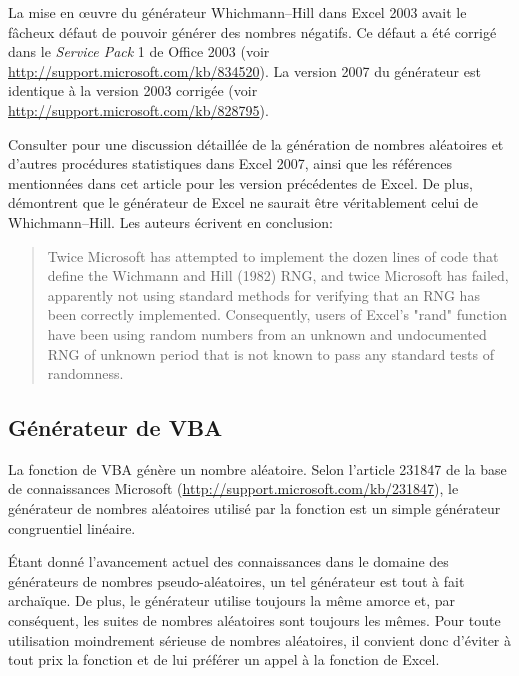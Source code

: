La mise en {\oe}uvre du générateur Whichmann--Hill dans Excel 2003
avait le fâcheux défaut de pouvoir générer des nombres négatifs. Ce
défaut a été corrigé dans le \emph{Service Pack} 1 de Office 2003
(voir \url{http://support.microsoft.com/kb/834520}). La version 2007
du générateur est identique à la version 2003 corrigée (voir
\url{http://support.microsoft.com/kb/828795}).

Consulter \cite{McCullough:Excel2007:2008} pour une discussion
détaillée de la génération de nombres aléatoires et d'autres
procédures statistiques dans Excel 2007, ainsi que les références
mentionnées dans cet article pour les version précédentes de Excel. De
plus, \citet{McCullough:MENTWH:2008} démontrent que le générateur de
Excel ne saurait être véritablement celui de Whichmann--Hill. Les
auteurs écrivent en conclusion:

\begin{quote}
  Twice Microsoft has attempted to implement the dozen lines of code
  that define the Wichmann and Hill (1982) RNG, and twice Microsoft
  has failed, apparently not using standard methods for verifying that
  an RNG has been correctly implemented. Consequently, users of
  Excel's "rand" function have been using random numbers from an
  unknown and undocumented RNG of unknown period that is not known to
  pass any standard tests of randomness.
\end{quote}



\subsection{Générateur de VBA}

\begin{sloppypar}
  La fonction  de VBA génère un nombre aléatoire. Selon
  l'article 231847 de la base de connaissances Microsoft
  (\url{http://support.microsoft.com/kb/231847}),
  le générateur de nombres aléatoires utilisé par la fonction
   est un simple générateur congruentiel linéaire.
\end{sloppypar}

Étant donné l'avancement actuel des connaissances dans le domaine des
générateurs de nombres pseudo-aléatoires, un tel générateur est tout à
fait archaïque. De plus, le générateur utilise toujours la même amorce
et, par conséquent, les suites de nombres aléatoires sont toujours les
mêmes. Pour toute utilisation moindrement sérieuse de nombres
aléatoires, il convient donc d'éviter à tout prix la fonction
 et de lui préférer un appel à la fonction 
de Excel.


